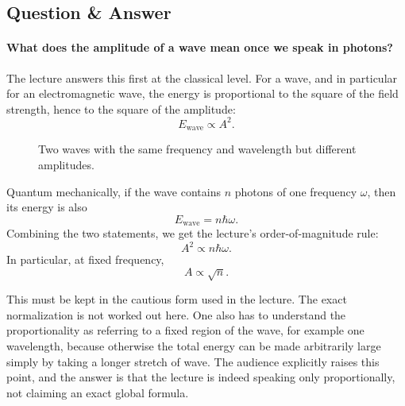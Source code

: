 \subsection{Question \& Answer}
\paragraph{What does the amplitude of a wave mean once we speak in photons?}
The lecture answers this first at the classical level. For a wave, and in particular for an electromagnetic wave, the energy is proportional to the square of the field strength, hence to the square of the amplitude:
\begin{equation}
E_{\text{wave}} \propto A^2.
\end{equation}

\begin{figure}[t]
\centering
{}
\caption{Two waves with the same frequency and wavelength but different amplitudes.}
\end{figure}

Quantum mechanically, if the wave contains \(n\) photons of one frequency \(\omega\), then its energy is also
\begin{equation}
E_{\text{wave}} = n\hbar\omega.
\end{equation}
Combining the two statements, we get the lecture's order-of-magnitude rule:
\begin{equation}
A^2 \propto n\hbar\omega.
\end{equation}
In particular, at fixed frequency,
\begin{equation}
A \propto \sqrt{n}.
\end{equation}

This must be kept in the cautious form used in the lecture. The exact normalization is not worked out here. One also has to understand the proportionality as referring to a fixed region of the wave, for example one wavelength, because otherwise the total energy can be made arbitrarily large simply by taking a longer stretch of wave. The audience explicitly raises this point, and the answer is that the lecture is indeed speaking only proportionally, not claiming an exact global formula.

